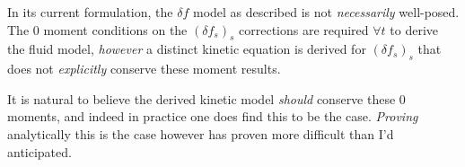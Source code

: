     In its current formulation, the $\delta\!f$ model as described is not \emph{necessarily} well-posed. The 0 moment conditions on the $(\delta\!f_{s})_{s}$ corrections are required $\forall t$ to derive the fluid model, \emph{however} a distinct kinetic equation is derived for $(\delta\!f_{s})_{s}$ that does not \emph{explicitly} conserve these moment results.

    \begin{remark}
        It is natural to believe the derived kinetic model \emph{should} conserve these 0 moments, and indeed in practice one does find this to be the case. \emph{Proving} analytically this is the case however has proven more difficult than I'd anticipated. 
    \end{remark}

